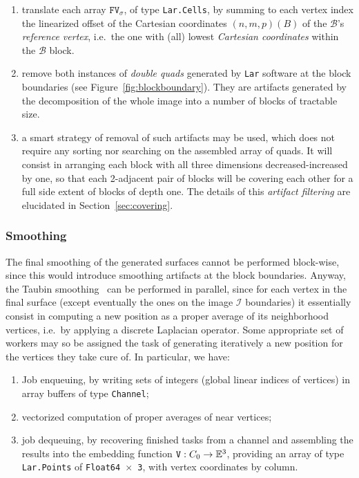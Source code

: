 \documentclass[11pt, oneside]{amsart}   	%
\begin{document}
\begin{enumerate}

\item translate each array $\mathtt{FV}_\sigma$, of type \texttt{Lar.Cells}, by summing to each vertex index the linearized offset of the Cartesian coordinates $(n,m,p)(B)$ of the $\mathcal{B}$'s \emph{reference vertex}, i.e.~the one with (all) lowest \emph{Cartesian coordinates} within the $\mathcal{B}$ block.

\item remove both instances of \emph{double quads} generated by \texttt{Lar} software at the block boundaries (see Figure~\ref{fig:blockboundary}). They are artifacts generated by the decomposition of the whole image into a number of blocks of tractable size.

\item 
a smart strategy of removal of such artifacts may be used, which does not require any sorting nor searching on the assembled array of quads. It will consist in arranging each block with all three dimensions decreased-increased by one, so that each 2-adjacent pair of blocks will be covering each other for a full side extent of blocks of depth one. The details of this \emph{artifact filtering} are elucidated in Section~\ref{sec:covering}.

\end{enumerate}

\subsubsection*{Smoothing}\label{sec:smoothing}
The final smoothing of the generated surfaces cannot be performed block-wise, since this would introduce smoothing artifacts at the block boundaries. Anyway, the Taubin smoothing~\cite{} can be performed in parallel, since for each vertex in the final surface (except eventually the ones on the image $\mathcal{I}$ boundaries) it essentially consist in computing a new position as a proper average of its neighborhood vertices, i.e.~by applying a discrete Laplacian operator.  Some appropriate set of workers may so be assigned the task of generating iteratively a new position for the vertices they take cure of. In particular, we have:
\begin{enumerate}

\item Job enqueuing, by writing sets of integers (global linear indices of vertices) in array buffers of type \texttt{Channel};

\item vectorized computation of proper averages of near vertices;

\item job dequeuing, by recovering finished tasks from a channel and assembling the results into the embedding function $\mathtt{V}: C_0 \to \mathbb{E}^3$, providing an array of type \texttt{Lar.Points} of \texttt{Float64 $\times$ 3}, with vertex coordinates by column.
\end{enumerate}
\end{document}
